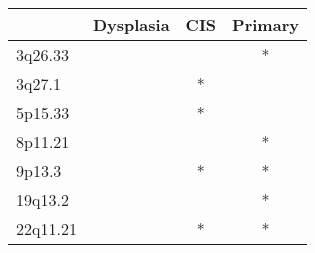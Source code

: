 \begin{tabular}{lccc}
\toprule
{} & Dysplasia & CIS & Primary \\
\midrule
3q26.33  &           &     &       * \\
3q27.1   &           &   * &         \\
5p15.33  &           &   * &         \\
8p11.21  &           &     &       * \\
9p13.3   &           &   * &       * \\
19q13.2  &           &     &       * \\
22q11.21 &           &   * &       * \\
\bottomrule
\end{tabular}
